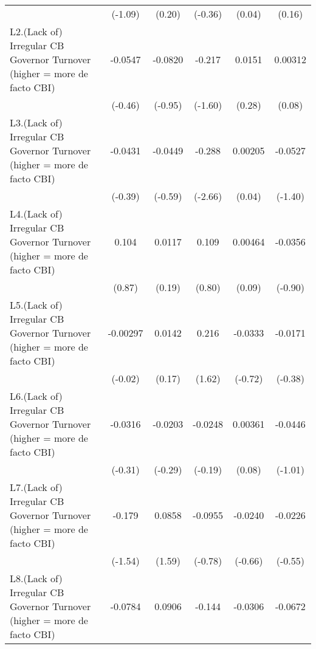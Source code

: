 {\begin{longtable}{l*{5}{c}}
                &  (-1.09)         &   (0.20)         &  (-0.36)         &   (0.04)         &   (0.16)         \\
\addlinespace
L2.(Lack of) Irregular CB Governor Turnover (higher = more de facto CBI)&  -0.0547         &  -0.0820         &   -0.217         &   0.0151         &  0.00312         \\
                &  (-0.46)         &  (-0.95)         &  (-1.60)         &   (0.28)         &   (0.08)         \\
\addlinespace
L3.(Lack of) Irregular CB Governor Turnover (higher = more de facto CBI)&  -0.0431         &  -0.0449         &   -0.288\sym{**} &  0.00205         &  -0.0527         \\
                &  (-0.39)         &  (-0.59)         &  (-2.66)         &   (0.04)         &  (-1.40)         \\
\addlinespace
L4.(Lack of) Irregular CB Governor Turnover (higher = more de facto CBI)&    0.104         &   0.0117         &    0.109         &  0.00464         &  -0.0356         \\
                &   (0.87)         &   (0.19)         &   (0.80)         &   (0.09)         &  (-0.90)         \\
\addlinespace
L5.(Lack of) Irregular CB Governor Turnover (higher = more de facto CBI)& -0.00297         &   0.0142         &    0.216         &  -0.0333         &  -0.0171         \\
                &  (-0.02)         &   (0.17)         &   (1.62)         &  (-0.72)         &  (-0.38)         \\
\addlinespace
L6.(Lack of) Irregular CB Governor Turnover (higher = more de facto CBI)&  -0.0316         &  -0.0203         &  -0.0248         &  0.00361         &  -0.0446         \\
                &  (-0.31)         &  (-0.29)         &  (-0.19)         &   (0.08)         &  (-1.01)         \\
\addlinespace
L7.(Lack of) Irregular CB Governor Turnover (higher = more de facto CBI)&   -0.179         &   0.0858         &  -0.0955         &  -0.0240         &  -0.0226         \\
                &  (-1.54)         &   (1.59)         &  (-0.78)         &  (-0.66)         &  (-0.55)         \\
\addlinespace
L8.(Lack of) Irregular CB Governor Turnover (higher = more de facto CBI)&  -0.0784         &   0.0906         &   -0.144         &  -0.0306         &  -0.0672         \\

\end{longtable}}
